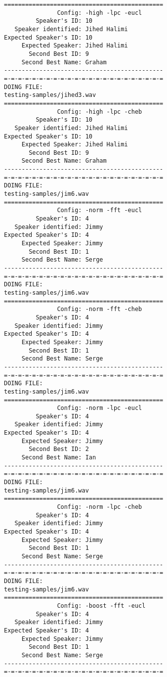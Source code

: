 \begin{verbatim}
=============================================
               Config: -high -lpc -eucl
         Speaker's ID: 10
   Speaker identified: Jihed Halimi
Expected Speaker's ID: 10
     Expected Speaker: Jihed Halimi
       Second Best ID: 9
     Second Best Name: Graham
---------------------------------------------
=-=-=-=-=-=-=-=-=-=-=-=-=-=-=-=-=-=-=-=-=-=-=
DOING FILE:
testing-samples/jihed3.wav
=============================================
               Config: -high -lpc -cheb
         Speaker's ID: 10
   Speaker identified: Jihed Halimi
Expected Speaker's ID: 10
     Expected Speaker: Jihed Halimi
       Second Best ID: 9
     Second Best Name: Graham
---------------------------------------------
=-=-=-=-=-=-=-=-=-=-=-=-=-=-=-=-=-=-=-=-=-=-=
DOING FILE:
testing-samples/jim6.wav
=============================================
               Config: -norm -fft -eucl
         Speaker's ID: 4
   Speaker identified: Jimmy
Expected Speaker's ID: 4
     Expected Speaker: Jimmy
       Second Best ID: 1
     Second Best Name: Serge
---------------------------------------------
=-=-=-=-=-=-=-=-=-=-=-=-=-=-=-=-=-=-=-=-=-=-=
DOING FILE:
testing-samples/jim6.wav
=============================================
               Config: -norm -fft -cheb
         Speaker's ID: 4
   Speaker identified: Jimmy
Expected Speaker's ID: 4
     Expected Speaker: Jimmy
       Second Best ID: 1
     Second Best Name: Serge
---------------------------------------------
=-=-=-=-=-=-=-=-=-=-=-=-=-=-=-=-=-=-=-=-=-=-=
DOING FILE:
testing-samples/jim6.wav
=============================================
               Config: -norm -lpc -eucl
         Speaker's ID: 4
   Speaker identified: Jimmy
Expected Speaker's ID: 4
     Expected Speaker: Jimmy
       Second Best ID: 2
     Second Best Name: Ian
---------------------------------------------
=-=-=-=-=-=-=-=-=-=-=-=-=-=-=-=-=-=-=-=-=-=-=
DOING FILE:
testing-samples/jim6.wav
=============================================
               Config: -norm -lpc -cheb
         Speaker's ID: 4
   Speaker identified: Jimmy
Expected Speaker's ID: 4
     Expected Speaker: Jimmy
       Second Best ID: 1
     Second Best Name: Serge
---------------------------------------------
=-=-=-=-=-=-=-=-=-=-=-=-=-=-=-=-=-=-=-=-=-=-=
DOING FILE:
testing-samples/jim6.wav
=============================================
               Config: -boost -fft -eucl
         Speaker's ID: 4
   Speaker identified: Jimmy
Expected Speaker's ID: 4
     Expected Speaker: Jimmy
       Second Best ID: 1
     Second Best Name: Serge
---------------------------------------------
=-=-=-=-=-=-=-=-=-=-=-=-=-=-=-=-=-=-=-=-=-=-=

\end{verbatim}
